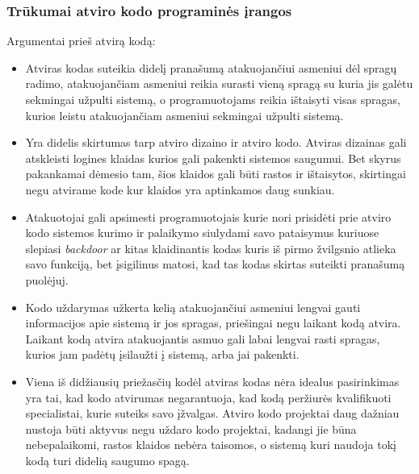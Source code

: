 \documentclass[a4paper,12pt,fleqn]{article}
\begin{document}
\subsubsection{Trūkumai atviro kodo programinės įrangos}
\label{sec:data}
Argumentai prieš atvirą kodą:
\begin{itemize}
	\item Atviras kodas suteikia didelį pranašumą atakuojančiui asmeniui dėl spragų radimo, atakuojančiam asmeniui reikia surasti vieną spragą su kuria jis galėtu sekmingai užpulti sistemą, o programuotojams reikia ištaisyti visas spragas, kurios leistu atakuojančiam asmeniui sekmingai užpulti sistemą.\cite{HoepmanJaap}
	\item Yra didelis skirtumas tarp atviro dizaino ir atviro kodo. Atviras dizainas gali atskleisti logines klaidas kurios gali pakenkti sistemos saugumui. Bet skyrus pakankamai dėmesio tam, šios klaidos gali būti rastos ir ištaisytos, skirtingai negu atvirame kode kur klaidos yra aptinkamos daug sunkiau. \cite{HoepmanJaap}
	\item Atakuotojai gali apsimesti programuotojais kurie nori prisidėti prie atviro kodo sistemos kurimo ir palaikymo siulydami savo pataisymus kuriuose slepiasi \textit{backdoor} ar kitas klaidinantis kodas kuris iš pirmo žvilgsnio atlieka savo funkciją, bet įsigilinus matosi, kad tas kodas skirtas suteikti pranašumą puolėjuj. \cite{951496}
	\item Kodo uždarymas užkerta kelią atakuojančiui asmeniui lengvai gauti informacijos apie sistemą ir jos spragas, priešingai negu laikant kodą atvira. Laikant kodą atvira atakuojantis asmuo gali labai lengvai rasti spragas, kurios jam padėtų įsilaužti į sistemą, arba jai pakenkti. \cite{HoepmanJaap}
	\item Viena iš didžiausių priežasčių kodėl atviras kodas nėra idealus pasirinkimas yra tai, kad kodo atvirumas negarantuoja, kad kodą peržiurės kvalifikuoti specialistai, kurie suteiks savo įžvalgas. Atviro kodo projektai daug dažniau nustoja būti aktyvus negu uždaro kodo projektai, kadangi jie būna nebepalaikomi, rastos klaidos nebėra taisomos, o sistemą kuri naudoja tokį kodą turi didelią saugumo spagą. \cite{951496}
\end{itemize}
\end{document}
